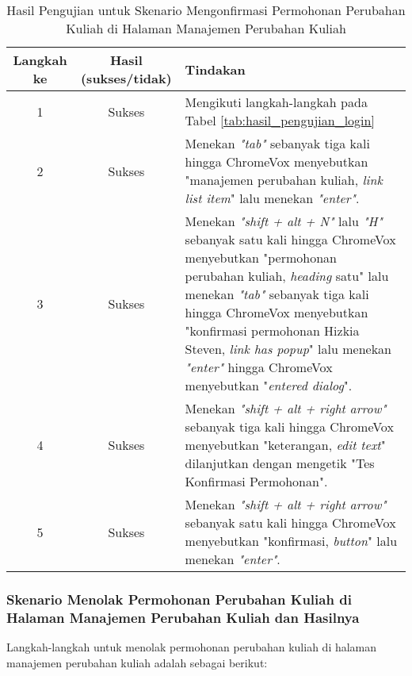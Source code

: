\begin{table}[H]
    \centering 
    \caption{Hasil Pengujian untuk Skenario Mengonfirmasi Permohonan Perubahan Kuliah di Halaman Manajemen Perubahan Kuliah}
    \label{tab:hasil_pengujian_mengonfirmasi_permohonan_perubahan_kuliah_di_halaman_manajemen_perubahan_kuliah}
    \begin{tabular}{|c|c|p{10cm}|}
        \toprule
        Langkah ke & Hasil (sukses/tidak) & Tindakan \\

        \midrule
        1 & Sukses & Mengikuti langkah-langkah pada Tabel \ref{tab:hasil_pengujian_login} \\
        2 & Sukses & Menekan \textit{"tab"} sebanyak tiga kali hingga ChromeVox menyebutkan "manajemen perubahan kuliah, \textit{link list item}" lalu menekan \textit{"enter"}. \\
        3 & Sukses & Menekan \textit{"shift + alt + N"} lalu \textit{"H"} sebanyak satu kali hingga ChromeVox menyebutkan "permohonan perubahan kuliah, \textit{heading} satu" lalu menekan \textit{"tab"} sebanyak tiga kali hingga ChromeVox menyebutkan "konfirmasi permohonan Hizkia Steven, \textit{link has popup}" lalu menekan \textit{"enter"} hingga ChromeVox menyebutkan "\textit{entered dialog}". \\
        4 & Sukses & Menekan \textit{"shift + alt + right arrow"} sebanyak tiga kali hingga ChromeVox menyebutkan "keterangan, \textit{edit text}" dilanjutkan dengan mengetik "Tes Konfirmasi Permohonan". \\
        5 & Sukses & Menekan \textit{"shift + alt + right arrow"} sebanyak satu kali hingga ChromeVox menyebutkan "konfirmasi, \textit{button}" lalu menekan \textit{"enter"}. \\ 

        \bottomrule

    \end{tabular}
\end{table}

\subsubsection{Skenario Menolak Permohonan Perubahan Kuliah di Halaman Manajemen Perubahan Kuliah dan Hasilnya}
\label{subsubsec:skenario_menolak_permohonan_perubahan_kuliah_di_halaman_manajemen_perubahan_kuliah}
Langkah-langkah untuk menolak permohonan perubahan kuliah di halaman manajemen perubahan kuliah adalah sebagai berikut:

